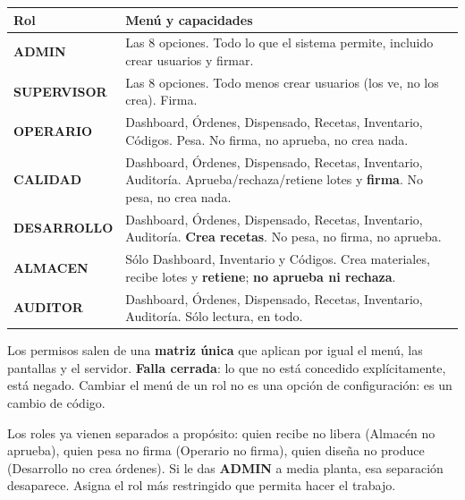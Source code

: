 
\begin{center}
\footnotesize
\begin{tabularx}{\linewidth}{@{}l >{\raggedright\arraybackslash}X@{}}
\toprule
\textbf{Rol} & \textbf{Menú y capacidades} \\
\midrule
\textbf{ADMIN}      & Las 8 opciones. Todo lo que el sistema permite, incluido crear usuarios y firmar. \\
\textbf{SUPERVISOR} & Las 8 opciones. Todo menos crear usuarios (los ve, no los crea). Firma. \\
\textbf{OPERARIO}   & Dashboard, Órdenes, Dispensado, Recetas, Inventario, Códigos. Pesa. No firma, no aprueba, no crea nada. \\
\textbf{CALIDAD}    & Dashboard, Órdenes, Dispensado, Recetas, Inventario, Auditoría. Aprueba/rechaza/retiene lotes y \textbf{firma}. No pesa, no crea nada. \\
\textbf{DESARROLLO} & Dashboard, Órdenes, Dispensado, Recetas, Inventario, Auditoría. \textbf{Crea recetas}. No pesa, no firma, no aprueba. \\
\textbf{ALMACEN}    & Sólo Dashboard, Inventario y Códigos. Crea materiales, recibe lotes y \textbf{retiene}; \textbf{no aprueba ni rechaza}. \\
\textbf{AUDITOR}    & Dashboard, Órdenes, Dispensado, Recetas, Inventario, Auditoría. Sólo lectura, en todo. \\
\bottomrule
\end{tabularx}
\end{center}

\vspace{6pt}

Los permisos salen de una \textbf{matriz única} que aplican por igual el menú, las
pantallas y el servidor. \textbf{Falla cerrada}: lo que no está concedido explícitamente,
está negado. Cambiar el menú de un rol no es una opción de configuración: es un cambio
de código.

\begin{cajaTip}
Los roles ya vienen separados a propósito: quien recibe no libera (Almacén no aprueba),
quien pesa no firma (Operario no firma), quien diseña no produce (Desarrollo no crea
órdenes). Si le das \textbf{ADMIN} a media planta, esa separación desaparece. Asigna el
rol más restringido que permita hacer el trabajo.
\end{cajaTip}

\newpage
{}

